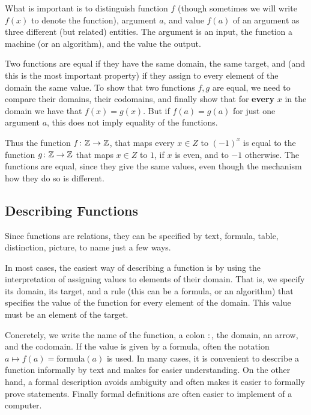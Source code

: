 What is important is to distinguish function $f$ (though sometimes we will write $f(x)$
to denote the function), argument $a$, and value
$f(a)$ of an
argument as three different (but related) entities. The argument is an
input, the function a machine (or an algorithm), and the value the output.
\smallskip

Two functions are equal if they have the same domain, the same target, and
(and this is the most important property)
if they assign to every element of the domain the same value.
To show that two functions $f,g$ are equal, we need to compare their
domains, their codomains, and finally show that for \textbf{every} $x$ in the
domain we have that $f(x)=g(x)$.
But if $f(a)=g(a)$ for just one argument $a$, this does not imply equality
of the functions.

Thus the function $f\colon{\mathbb Z}\to{\mathbb Z}$, that maps every $x\in Z$ to $(-1)^x$ is
equal to the function $g\colon{\mathbb Z}\to{\mathbb Z}$ that maps $x\in Z$ to $1$, if $x$ is
even, and to $-1$ otherwise. The functions are equal, since they give the
same values, even though the mechanism how they do so is different.

\subsection{Describing Functions}
Since functions are relations, they can be specified by
text, formula, table, distinction, picture,
to name just a few ways. 

In most cases, the easiest way of describing a function is by
using the interpretation of assigning values to elements of
their domain. That is, we specify
its domain, its target, and a rule (this can be a formula, or an algorithm)
that specifies the value of the
function for every element of the domain. This value must be an element of
the target.

Concretely, we write the name of the
function, a colon $\colon$, the domain, an arrow, and the codomain. If the
value is given by a formula, often the notation $a\mapsto f(a)=\mbox{formula}(a)$
is used. In many cases, it is convenient to describe a function informally
by text and makes for easier understanding. On the other hand, a formal
description avoids ambiguity and often makes it easier to formally prove
statements. Finally formal definitions are often easier to implement of a
computer.

